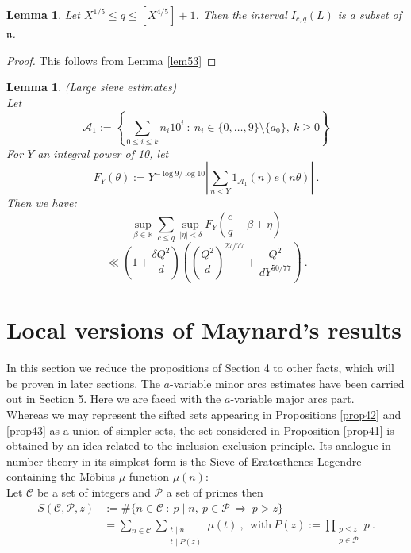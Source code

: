 \documentclass{amsart}
\newtheorem{lemma}[theorem]{Lemma}
\numberwithin{equation}{subsection}
\begin{document}
\begin{lemma}\label{lem516*}
Let $X^{1/5}\leq q \leq [X^{4/5}]+1$. Then the interval $I_{c,q}(L)$ is a subset of $\mathfrak{n}$.
\end{lemma}
\begin{proof}
This follows from Lemma \ref{lem53}
\end{proof}

\begin{lemma}\label{lem514}(Large sieve estimates)\\
Let
$$\mathcal{A}_1:=\left\{ \sum_{0\leq i\leq k} n_i 10^i\::\: n_i\in \{0,\ldots, 9\}\setminus \{a_0\},\ k\geq 0  \right\}$$
For $Y$ an integral power of 10, let
$$F_Y(\theta):=Y^{-\log 9/\log 10}\left| \sum_{n<Y} 1_{\mathcal{A}_1}(n) e(n\theta) \right|\:. $$
Then we have:
$$\sup_{\beta\in\mathbb{R}}\sum_{c\leq q} \sup_{|\eta|<\delta} F_Y\left(\frac{c}{q}+\beta+\eta\right)$$
$$\ll \left(1+\frac{\delta Q^2}{d}\right)\left(\left(\frac{Q^2}{d}\right)^{27/77}+\frac{Q^2}{dY^{50/77}}\right)\:.$$
\end{lemma}







\section{Local versions of Maynard's results}

In this section we reduce the propositions of Section 4 to other facts, which will be proven in later sections. The $a$-variable minor arcs estimates have been carried out in Section 5. Here we are faced with the $a$-variable major arcs part. \\
Whereas we may represent the sifted sets appearing in Propositions \ref{prop42} and  \ref{prop43} as a union of simpler sets, the set considered in Proposition \ref{prop41} is obtained by an idea related to the inclusion-exclusion principle. Its analogue in number theory in its simplest form is the Sieve of Eratosthenes-Legendre containing the M\"obius $\mu$-function $\mu(n)$:\\
Let $\mathcal{C}$ be a set of integers and $\mathcal{P}$ a set of primes then 
\begin{align*}
S(\mathcal{C}, \mathcal{P}, z)&:=\#\{n\in \mathcal{C}\::\: p\mid n,\ p\in \mathcal{P}\ \Rightarrow \ p>z\}\\
&=\sum_{n\in \mathcal{C}}\sum_{\substack{t\mid n \\ t\mid P(z)}}\mu (t)\:,\ \ \text{with}\ P(z):=\prod_{\substack{p\leq z \\ p\in \mathcal{P}}} p\:.
\end{align*}
\end{document}
